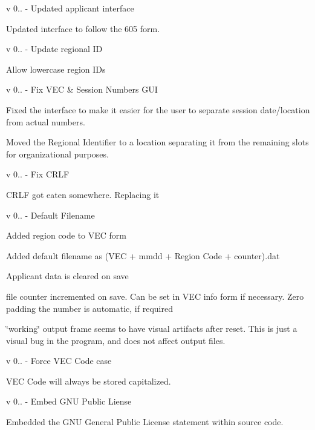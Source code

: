 v 0.. -\/ Updated applicant interface
\begin{DoxyItemize}
\item Updated interface to follow the 605 form.
\end{DoxyItemize}

v 0.. -\/ Update regional ID
\begin{DoxyItemize}
\item Allow lowercase region I\+Ds
\end{DoxyItemize}

v 0.. -\/ Fix V\+EC \& Session Numbers G\+UI
\begin{DoxyItemize}
\item Fixed the interface to make it easier for the user to separate session date/location from actual numbers.
\item Moved the Regional Identifier to a location separating it from the remaining slots for organizational purposes.
\end{DoxyItemize}

v 0.. -\/ Fix C\+R\+LF
\begin{DoxyItemize}
\item C\+R\+LF got eaten somewhere. Replacing it
\end{DoxyItemize}

v 0.. -\/ Default Filename
\begin{DoxyItemize}
\item Added region code to V\+EC form
\item Added default filename as (V\+EC + mmdd + Region Code + counter).dat
\item Applicant data is cleared on save
\item file counter incremented on save. Can be set in V\+EC info form if necessary. Zero padding the number is automatic, if required
\item \char`\"{}working\char`\"{} output frame seems to have visual artifacts after reset. This is just a visual bug in the program, and does not affect output files.
\end{DoxyItemize}

v 0.. -\/ Force V\+EC Code case
\begin{DoxyItemize}
\item V\+EC Code will always be stored capitalized.
\end{DoxyItemize}

v 0.. -\/ Embed G\+NU Public Liense
\begin{DoxyItemize}
\item Embedded the G\+NU General Public License statement within source code.
\end{DoxyItemize}

